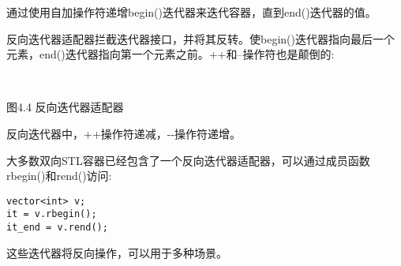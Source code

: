 通过使用自加操作符递增begin()迭代器来迭代容器，直到end()迭代器的值。

反向迭代器适配器拦截迭代器接口，并将其反转。使begin()迭代器指向最后一个元素，end()迭代器指向第一个元素之前。++和--操作符也是颠倒的:

\hspace*{\fill} \\ %
\begin{center}

图4.4 反向迭代器适配器
\end{center}


反向迭代器中，++操作符递减，-{}-操作符递增。

大多数双向STL容器已经包含了一个反向迭代器适配器，可以通过成员函数rbegin()和rend()访问:

\begin{lstlisting}[style=styleCXX]
vector<int> v;
it = v.rbegin();
it_end = v.rend();
\end{lstlisting}

这些迭代器将反向操作，可以用于多种场景。
